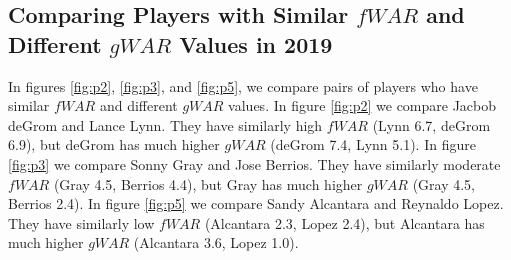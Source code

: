 \documentclass[12pt]{article}
\begin{document}



\subsection{Comparing Players with Similar $fWAR$ and Different $gWAR$ Values in 2019}

In figures \ref{fig:p2}, \ref{fig:p3}, and \ref{fig:p5}, we compare pairs of players who have similar $fWAR$ and different $gWAR$ values. In figure \ref{fig:p2} we compare Jacbob deGrom and Lance Lynn. They have similarly high $fWAR$ (Lynn 6.7, deGrom 6.9), but deGrom has much higher $gWAR$ (deGrom 7.4, Lynn 5.1). In figure \ref{fig:p3} we compare Sonny Gray and Jose Berrios. They have similarly moderate $fWAR$ (Gray 4.5, Berrios 4.4), but Gray has much higher $gWAR$ (Gray 4.5, Berrios 2.4). In figure \ref{fig:p5} we compare Sandy Alcantara and Reynaldo Lopez. They have similarly low $fWAR$ (Alcantara 2.3, Lopez 2.4), but Alcantara has much higher $gWAR$ (Alcantara 3.6, Lopez 1.0). 
\end{document}
